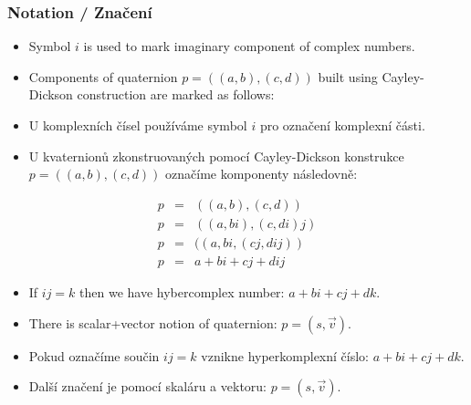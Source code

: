 \begin{frame}\frametitle{Notation / Značení}\scriptsize
\begin{itemize}
\item Symbol $i$ is used to mark imaginary component of complex numbers.
\item Components of quaternion $p=((a,b),(c,d))$ built using Cayley-Dickson construction are marked as follows:
\end{itemize}
\begin{itemize}
\item U komplexních čísel používáme symbol $i$ pro označení komplexní části.
\item U kvaternionů zkonstruovaných pomocí Cayley-Dickson konstrukce $p=((a,b),(c,d))$ označíme komponenty následovně:
\end{itemize}
\begin{eqnarray*}
p &=& ((a,b),(c,d))\\
p &=& ((a,bi),(c,di)j)\\
p &=& ((a,bi,(cj,dij))\\
p &=& a+bi+cj+dij
\end{eqnarray*}
\begin{itemize}
\item If $ij=k$ then we have hybercomplex number: $a+bi+cj+dk$.
\item There is scalar+vector notion of quaternion: $p=(s,\vec v)$.
\end{itemize}

\begin{itemize}
\item Pokud označíme součin $ij=k$ vznikne hyperkomplexní číslo: $a+bi+cj+dk$.
\item Další značení je pomocí skaláru a vektoru: $p=(s,\vec v)$.
\end{itemize}
\end{frame}

